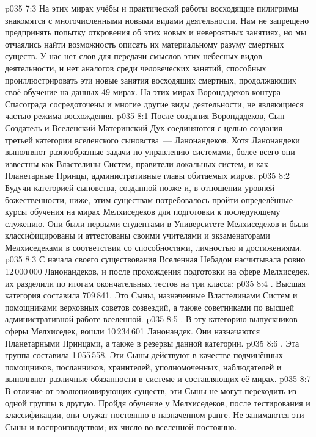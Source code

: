 \vs p035 7:3 На этих мирах учёбы и практической работы восходящие пилигримы знакомятся с многочисленными новыми видами деятельности. Нам не запрещено предпринять попытку откровения об этих новых и невероятных занятиях, но мы отчаялись найти возможность описать их материальному разуму смертных существ. У нас нет слов для передачи смыслов этих небесных видов деятельности, и нет аналогов среди человеческих занятий, способных проиллюстрировать эти новые занятия восходящих смертных, продолжающих своё обучение на данных 49 мирах. На этих мирах Ворондадеков контура Спасограда сосредоточены и многие другие виды деятельности, не являющиеся частью режима восхождения.
\vs p035 8:1 После создания Ворондадеков, Сын Создатель и Вселенский Материнский Дух соединяются с целью создания третьей категории вселенского сыновства~--- Ланонандеков. Хотя Ланонандеки выполняют разнообразные задачи по управлению системами, более всего они известны как Властелины Систем, правители локальных систем, и как Планетарные Принцы, административные главы обитаемых миров.
\vs p035 8:2 Будучи категорией сыновства, созданной позже и, в отношении уровней божественности, ниже, этим существам потребовалось пройти определённые курсы обучения на мирах Мелхиседеков для подготовки к последующему служению. Они были первыми студентами в Университете Мелхиседеков и были классифицированы и аттестованы своими учителями и экзаменаторами Мелхиседеками в соответствии со способностями, личностью и достижениями.
\vs p035 8:3 С начала своего существования Вселенная Небадон насчитывала ровно 12\,000\,000 Ланонандеков, и после прохождения подготовки на сфере Мелхиседек, их разделили по итогам окончательных тестов на три класса:
\vs p035 8:4 . Высшая категория составила 709\,841. Это Сыны, назначенные Властелинами Систем и помощниками верховных советов созвездий, а также советниками по высшей административной работе вселенной.
\vs p035 8:5 . В эту категорию выпускников сферы Мелхиседек, вошли 10\,234\,601 Ланонандек. Они назначаются Планетарными Принцами, а также в резервы данной категории.
\vs p035 8:6 . Эта группа составила 1\,055\,558. Эти Сыны действуют в качестве подчинённых помощников, посланников, хранителей, уполномоченных, наблюдателей и выполняют различные обязанности в системе и составляющих её мирах.
\vs p035 8:7 \pc В отличие от эволюционирующих существ, эти Сыны не могут переходить из одной группы в другую. Пройдя обучение у Мелхиседеков, после тестирования и классификации, они служат постоянно в назначенном ранге. Не занимаются эти Сыны и воспроизводством; их число во вселенной постоянно.
